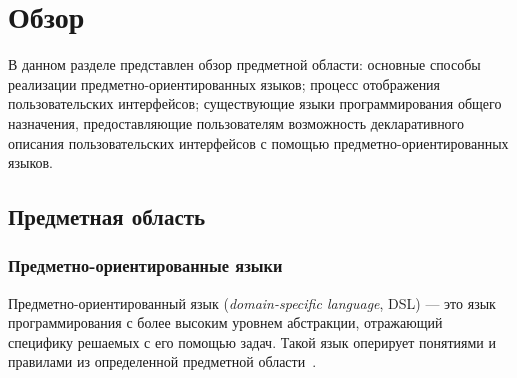 \section{Обзор}
В данном разделе представлен обзор предметной области:
основные способы реализации предметно-ориентированных языков; 
процесс отображения пользовательских интерфейсов;
существующие языки программирования общего назначения, предоставляющие
пользователям возможность декларативного описания пользовательских
интерфейсов с помощью предметно-ориентированных языков.

\subsection{Предметная область}
\subsubsection{Предметно-ориентированные языки}
\label{dsl-section}
Предметно-ориентированный язык (\textit{domain-specific language}, DSL) ---
это язык программирования с более высоким уровнем абстракции,
отражающий специфику решаемых с его помощью задач. Такой язык оперирует
понятиями и правилами из определенной предметной области~\cite{book-of-dsls}.

